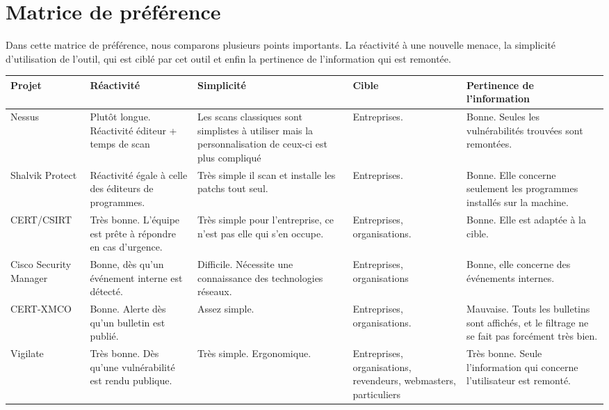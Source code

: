 \section{Matrice de préférence}
\thispagestyle{plain}

Dans cette matrice de préférence, nous comparons plusieurs points importants. La réactivité à une nouvelle menace, la simplicité d’utilisation de l’outil, qui est ciblé par cet outil et enfin la pertinence de l’information qui est remontée.\\

\small
\begin{tabular}{|p{2.5cm}|p{3.5cm}|p{3.5cm}|p{2cm}|p{3.5cm}|}
  \hline
  \rowcolor{Gainsboro}Projet & Réactivité & Simplicité & Cible & Pertinence de l'information \\
\hline

  Nessus & Plutôt longue. Réactivité éditeur + temps de scan & Les scans classiques sont simplistes à utiliser mais la personnalisation de ceux-ci est plus compliqué & Entreprises. & Bonne. Seules les vulnérabilités trouvées sont remontées. \\
\hline

  Shalvik Protect & Réactivité égale à celle des éditeurs de programmes. & Très simple il scan et installe les patchs tout seul. & Entreprises. & Bonne. Elle concerne seulement les programmes installés sur la machine. \\
\hline

  CERT/CSIRT & Très bonne. L’équipe est prête à répondre en cas d’urgence. & Très simple pour l’entreprise, ce n'est pas elle qui s’en occupe. & Entreprises, organisations. & Bonne. Elle est adaptée à la cible.\\
\hline

  Cisco Security Manager & Bonne, dès qu’un événement interne est détecté. & Difficile. Nécessite une connaissance des technologies réseaux. & Entreprises, organisations & Bonne, elle concerne des événements internes.\\
\hline

  CERT-XMCO & Bonne. Alerte dès qu’un bulletin est publié. & Assez simple. & Entreprises, organisations. & Mauvaise. Touts les bulletins sont affichés, et le filtrage ne se fait pas forcément très bien. \\
\hline

  Vigilate & Très bonne. Dès qu’une vulnérabilité est rendu publique. & Très simple. Ergonomique. & Entreprises, organisations, revendeurs, webmasters, particuliers & Très bonne. Seule l’information qui concerne l’utilisateur est remonté. \\
\hline
\end{tabular}
\normalsize  


